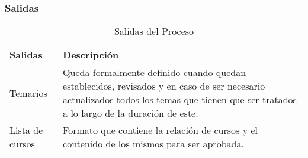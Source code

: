 \subsubsection{Salidas}

\begin{table}[H]
\centering
	\begin{tabular}{p{5cm} p{11cm}}
		\hline
			\textbf{Salidas} & \textbf{Descripción}\\
		\hline
		\hline
			Temarios & Queda formalmente definido cuando quedan establecidos, revisados y en caso de ser necesario actualizados todos los temas que tienen que ser tratados a lo largo de la duración de este.
			\\\hline
			Lista de cursos & Formato que contiene la relación de cursos y el contenido de los mismos para ser aprobada.
			\\
		\hline	
	\end{tabular}
\caption{Salidas del Proceso}
\end{table}
